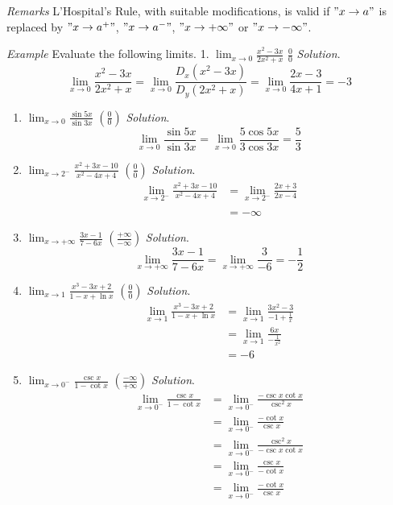 \documentclass[
  letterpaper,
  DIV=11,
  numbers=noendperiod]{scrartcl}
\theoremstyle{plain}
\theoremstyle{remark}
\begin{document}
\leavevmode{}%
\emph{Remarks} L'Hospital's Rule, with suitable modifications, is valid
if \("x \to a"\) is replaced by \("x \to a^+"\), \("x \to a^-"\),
\("x \to +\infty"\) or \("x \to -\infty"\).

\leavevmode{}%
\emph{Example} Evaluate the following limits. 1.
\(\displaystyle\lim_{x \to 0} \frac{x^2-3x}{2x^2+x}\) \(\frac{0}{0}\)
\emph{Solution}. \[
\displaystyle\lim_{x \to 0} \frac{x^2-3x}{2x^2+x}=\displaystyle\lim_{x \to 0} \frac{D_x\left(x^2-3x\right)}{D_y\left(2x^2+x\right)}=\displaystyle\lim_{x \to 0} \frac{2x-3}{4x+1}=-3
\]

\begin{enumerate}
\def\labelenumi{\arabic{enumi}.}
\setcounter{enumi}{1}
\item
  \(\displaystyle\lim_{x \to 0} \frac{\sin5x}{\sin3x}\)
  \(\left(\frac{0}{0}\right)\) \emph{Solution}. \[
  \displaystyle\lim_{x \to 0} \frac{\sin5x}{\sin3x}=\displaystyle\lim_{x \to 0} \frac{5\cos5x}{3\cos3x}=\frac{5}{3}
  \]
\item
  \(\displaystyle\lim_{x \to 2^-} \frac{x^2+3x-10}{x^2-4x+4}\)
  \(\left(\frac{0}{0}\right)\) \emph{Solution}. \[
  \begin{aligned}
  \displaystyle\lim_{x \to 2^-} \frac{x^2+3x-10}{x^2-4x+4}&=\displaystyle\lim_{x \to 2^-}\frac{2x+3}{2x-4}\\&\\&=-\infty
  \end{aligned}
  \]
\item
  \(\displaystyle\lim_{x \to +\infty}\frac{3x-1}{7-6x}\)
  \(\left(\frac{+\infty}{-\infty}\right)\) \emph{Solution}. \[
  \displaystyle\lim_{x \to +\infty}\frac{3x-1}{7-6x}=\displaystyle\lim_{x \to +\infty} \frac{3}{-6}=-\frac{1}{2}
  \]
\item
  \(\displaystyle\lim_{x \to 1} \frac{x^3-3x+2}{1-x+\ln x}\)
  \(\left(\frac{0}{0}\right)\) \emph{Solution}. \[
  \begin{aligned}
  \displaystyle\lim_{x \to 1} \frac{x^3-3x+2}{1-x+\ln x}&=\displaystyle\lim_{x \to 1}\frac{3x^2-3}{-1+\frac{1}{x}}\\&=\displaystyle\lim_{x \to 1}\frac{6x}{-\frac{1}{x^2}}\\&=-6
  \end{aligned}
  \]
\item
  \(\displaystyle\lim_{x \to 0^-}\frac{\csc x}{1-\cot x}\)
  \(\left(\frac{-\infty}{+\infty}\right)\) \emph{Solution}. \[
  \begin{aligned}
  \displaystyle\lim_{x \to 0^-}\frac{\csc x}{1-\cot x}&=\displaystyle\lim_{x \to 0^-}\frac{-\csc x \cot x}{\csc^2 x}\\&=\displaystyle\lim_{x \to 0^-}\frac{-\cot x}{\csc x}\\&=\displaystyle\lim_{x \to 0^-} \frac{\csc^2 x}{-\csc x \cot x}\\&=\displaystyle\lim_{x \to 0^-}\frac{\csc x}{-\cot x}\\&=\displaystyle\lim_{x \to 0^-}\frac{-\cot x}{\csc x}
  \end{aligned}
  \]
\end{enumerate}
\end{document}
